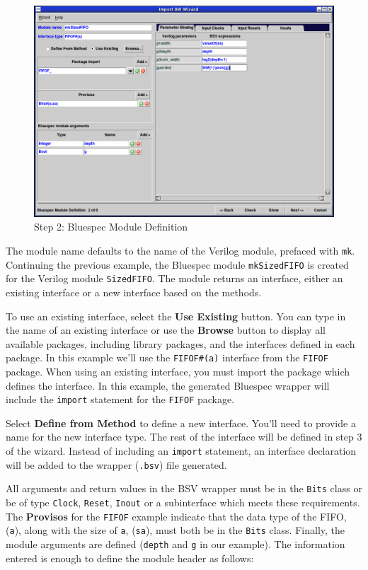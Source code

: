 \documentclass{article}
\newcommand{\te}[1]{\texttt{#1}}
\begin{document}
\begin{figure}[htbp]
\begin{center}
\includegraphics[width = 5 in]{figures/importbvi2}
\caption{Step 2: Bluespec Module Definition }
\label{fig-importbvi2}
\end{center}
\end{figure}


The module name defaults to the name of the Verilog module, prefaced
with \te{mk}.  Continuing the previous example, the Bluespec module
\te{mkSizedFIFO} is created for the Verilog module \te{SizedFIFO}.
The module returns an interface, either an  existing
interface or  a new interface based on the methods.

To use an existing interface, select the {\bf Use Existing}
button.  You can type in the name of an existing interface or
 use the {\bf Browse} button
to display all available packages, including library packages, and
the interfaces defined in each package.   In this example we'll  use the
\te{FIFOF\#(a)} interface from the
\te{FIFOF} package.  When using an existing interface, you must
import the package which defines the interface.  In this example, the
generated Bluespec wrapper will include the \te{import} statement for
the \te{FIFOF} package.

 Select {\bf Define from
Method} to define a new interface.  You'll need to provide a name for
the new interface
type. The rest of  the interface will be defined in  step 3 of the
wizard.  Instead of including an \te{import} statement, an interface
declaration will be added to the wrapper   (\te{.bsv}) file generated.


All arguments and return values in the BSV wrapper must be in the \te{Bits}
class or be of type \te{Clock}, \te{Reset}, \te{Inout} or a
subinterface which meets these requirements.  The {\bf Provisos} for
the \te{FIFOF} example indicate that the data type of the FIFO,
(\te{a}), along with the size of \te{a}, (\te{sa}), must both be in the
\te{Bits} class.  Finally, the module arguments are defined (\te{depth}
and \te{g} in our example).  The information entered is   enough to define
the module header  as follows:
\end{document}
